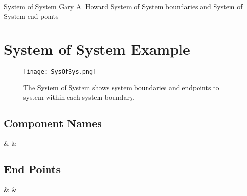 \documentclass{tlc-article}%
\begin{document}
%

\tlcTitlePageAndTableOfContents
  {System of System}
  {Gary A. Howard}
  {System of System boundaries and System of System end-points}

\section{System of System Example}%

  \begin{figure}[h!]%
    \centering%
    \texttt{[image: SysOfSys.png]}%
    \caption{The System of System shows system boundaries and endpoints to system within each system boundary.}
    \label{fig:sysofssys}%
  \end{figure}%

  \subsection{Component Names}%
    {} %
    {\nickname & \name & \description} %

  \subsection{End Points}%
    {} %
    {\nickname & \route & \endpoint} %
\end{document}
